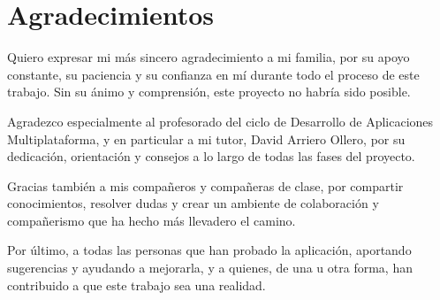 \chapter*{Agradecimientos}

Quiero expresar mi más sincero agradecimiento a mi familia, por su apoyo constante, su paciencia y su confianza en mí durante todo el proceso de este trabajo. Sin su ánimo y comprensión, este proyecto no habría sido posible.

Agradezco especialmente al profesorado del ciclo de Desarrollo de Aplicaciones Multiplataforma, y en particular a mi tutor, David Arriero Ollero, por su dedicación, orientación y consejos a lo largo de todas las fases del proyecto.

Gracias también a mis compañeros y compañeras de clase, por compartir conocimientos, resolver dudas y crear un ambiente de colaboración y compañerismo que ha hecho más llevadero el camino.

Por último, a todas las personas que han probado la aplicación, aportando sugerencias y ayudando a mejorarla, y a quienes, de una u otra forma, han contribuido a que este trabajo sea una realidad. 